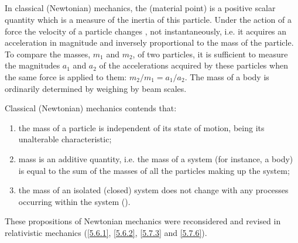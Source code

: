 \subsection{}\label{2.3.1} In classical (Newtonian) mechanics, the  (material point) is a positive scalar quantity which is a measure of the inertia of this particle. Under the action of a force the velocity of a particle changes , not instantaneously, i.e. it acquires an acceleration  in magnitude and inversely proportional to the mass of the particle. To compare the masses, $m_{1}$ and $m_{2}$, of two particles, it is sufficient to measure the magnitudes $a_{1}$ and $a_{2}$ of the accelerations acquired by these particles when the same force is applied to them: $m_{2}/m_{1}= a_{1}/a_{2}$. The mass of a body is ordinarily determined by weigh­ing by beam scales.

Classical (Newtonian) mechanics contends that:
\begin{enumerate}[label=(\alph*)]
\item the mass of a particle is independent of its state of motion, being its unalterable characteristic;
\item mass is an additive quantity, i.e. the mass of a system (for instance, a body) is equal to the sum of the masses of all the particles making up the system;
\item the mass of an isolated (closed) system  does not change with any processes occurring within the system ().
\end{enumerate}

These propositions of Newtonian mechanics were reconsidered and revised in relativistic mechanics (\ref{5.6.1}, \ref{5.6.2}, \ref{5.7.3} and \ref{5.7.6}).

